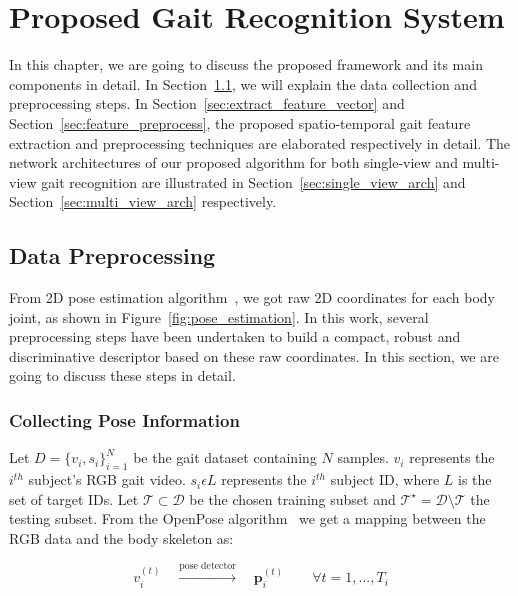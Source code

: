 \chapter{Proposed Gait Recognition System} \label{ch:methodology}
In this chapter, we are going to discuss the proposed framework and its main components in detail. In Section~\ref{sec:preprocess}, we will explain the data collection and preprocessing steps. In Section~\ref{sec:extract_feature_vector} and Section~\ref{sec:feature_preprocess}, the proposed spatio-temporal gait feature extraction and preprocessing techniques are elaborated respectively in detail. The network architectures of our proposed algorithm for both single-view and multi-view gait recognition are illustrated in Section~\ref{sec:single_view_arch} and Section~\ref{sec:multi_view_arch} respectively. 



\section{Data Preprocessing} \label{sec:preprocess}
From 2D pose estimation algorithm~\cite{Cao_19}, we got raw 2D coordinates for each body joint, as shown in Figure~\ref{fig:pose_estimation}. In this work, several preprocessing steps have been undertaken to build a compact, robust and discriminative descriptor based on these raw coordinates. In this section, we are going to discuss these steps in detail.

\subsection{Collecting Pose Information}
Let $D = {\{{v_{i},s_{i}\}}^{N}_{i=1}}$ be the gait dataset containing $N$ samples. $v_i$ represents the ${i}^{th}$ subject's RGB gait video. $s_{i} \epsilon L$ represents the ${i}^{th}$ subject ID, where $L$ is the set of target IDs.  Let $\mathcal{T} \subset \mathcal{D}$ be the chosen training subset and $\mathcal{T^\star} = \mathcal{D} \setminus \mathcal{T}$ the testing subset. From the OpenPose algorithm~\cite{Cao_19} we get a mapping between the RGB data and the body skeleton as:

\begin{equation}
v_i^{(t)}\quad \xrightarrow[]{\text{pose detector}}\quad \mathbf{p}_i^{(t)} \qquad\forall t= 1,...,T_i 
\end{equation}

